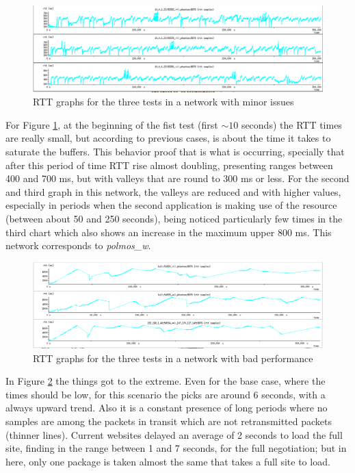 \begin{figure}[ht]
\centering
    \includegraphics[width=\textwidth]{img/n_iperf_mid}
\caption[Iperf: RTT graphs for a network with minor issues]{RTT graphs for the three tests in a network with minor issues}
\label{fig:iperfmid}
\end{figure}%


For Figure \ref{fig:iperfmid}, at the beginning of the fist test (first $\sim10$ seconds) the RTT times are really small, but according to previous cases, is about the time it takes to saturate the buffers. This behavior proof that is what is occurring, specially that after this period of time RTT rise almost doubling, presenting ranges between 400 and 700 ms, but with valleys that are round to  300 ms or less. For the second and third graph in this network, the valleys are reduced and with higher values, especially in periods when the second application is making use of the resource (between about 50 and 250 seconds), being noticed particularly few times in the third chart which also shows an increase in the maximum upper 800 ms. This network corresponds to \textit{polmos\_w}.

\begin{figure}[ht]
\centering
    \includegraphics[width=\textwidth]{img/n_iperf_bad}
\caption[Iperf: RTT graphs for a network with bad performance]{RTT graphs for the three tests in a network with bad performance}
\label{fig:iperfbad}
\end{figure}%

In Figure \ref{fig:iperfbad} the things got to the extreme. Even for the base
case, where the times should be low, for this scenario the picks are around 6
seconds, with a always upward trend. Also it is a constant presence of long
periods where no samples are among the packets in transit which are not
retransmitted packets (thinner lines). Current websites delayed an average of 2
seconds to load the full site, finding in the range between 1 and 7 seconds,
for the full negotiation; but in here, only one package is taken almost the
same that takes a full site to load.

